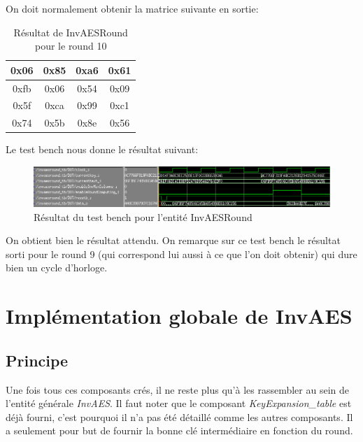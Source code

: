 \documentclass[a4paper, 12pt]{article}
\begin{document}
On doit normalement obtenir la matrice suivante en sortie:
			\begin{table}[H]
				\begin{center}
				\begin{tabular}{|c|c|c|c|}
					\hline
					0x06 & 0x85 & 0xa6 & 0x61 \\
					\hline
					0xfb & 0x06 & 0x54 & 0x09 \\
					\hline
					0x5f & 0xca & 0x99 & 0xc1 \\
					\hline
					0x74 & 0x5b & 0x8e & 0x56 \\
					\hline
				\end{tabular}
				\caption{Résultat de InvAESRound pour le round 10}
				\label{MatriceSortieInvAESRound}
				\end{center}
			\end{table}
			
Le test bench nous donne le résultat suivant:
			\begin{figure}[H]
				\begin{center}
				\includegraphics[scale=0.68]{Images/InvAESRoundTb.png}
				\end{center}
				\caption{Résultat du test bench pour l'entité InvAESRound}
				\label{InvAESRoundTb}
			\end{figure}
On obtient bien le résultat attendu. On remarque sur ce test bench le résultat sorti pour le round 9 (qui correspond lui aussi à ce que l'on doit obtenir) qui dure bien un cycle d'horloge.

		
\section{Implémentation globale de InvAES}
	\subsection{Principe}
Une fois tous ces composants crés, il ne reste plus qu'à les rassembler au sein de l'entité générale \emph{InvAES}. Il faut noter que le composant \emph{KeyExpansion\_table} est déjà fourni, c'est pourquoi il n'a pas été détaillé comme les autres composants. Il a seulement pour but de fournir la bonne clé intermédiaire en fonction du round. 
\end{document}
